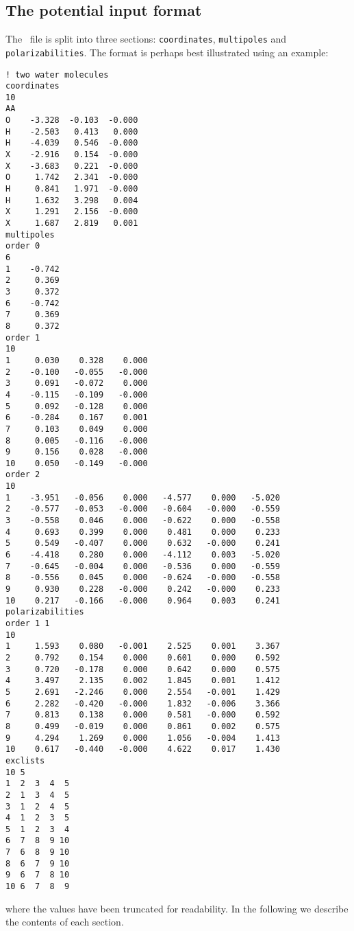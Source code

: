 \subsection*{The potential input format}
The \potinp\ file is split into three sections: \verb|coordinates|, 
\verb|multipoles| and \verb|polarizabilities|. The format is perhaps best 
illustrated using an example:
\begin{verbatim}
! two water molecules
coordinates
10
AA
O    -3.328  -0.103  -0.000
H    -2.503   0.413   0.000
H    -4.039   0.546  -0.000
X    -2.916   0.154  -0.000
X    -3.683   0.221  -0.000
O     1.742   2.341  -0.000
H     0.841   1.971  -0.000
H     1.632   3.298   0.004
X     1.291   2.156  -0.000
X     1.687   2.819   0.001
multipoles
order 0
6
1    -0.742
2     0.369
3     0.372
6    -0.742
7     0.369
8     0.372
order 1
10
1     0.030    0.328    0.000
2    -0.100   -0.055   -0.000
3     0.091   -0.072    0.000
4    -0.115   -0.109   -0.000
5     0.092   -0.128    0.000
6    -0.284    0.167    0.001
7     0.103    0.049    0.000
8     0.005   -0.116   -0.000
9     0.156    0.028   -0.000
10    0.050   -0.149   -0.000
order 2
10
1    -3.951   -0.056    0.000   -4.577    0.000   -5.020
2    -0.577   -0.053   -0.000   -0.604   -0.000   -0.559
3    -0.558    0.046    0.000   -0.622    0.000   -0.558
4     0.693    0.399    0.000    0.481    0.000    0.233
5     0.549   -0.407    0.000    0.632   -0.000    0.241
6    -4.418    0.280    0.000   -4.112    0.003   -5.020
7    -0.645   -0.004    0.000   -0.536    0.000   -0.559
8    -0.556    0.045    0.000   -0.624   -0.000   -0.558
9     0.930    0.228   -0.000    0.242   -0.000    0.233
10    0.217   -0.166   -0.000    0.964    0.003    0.241
polarizabilities
order 1 1
10
1     1.593    0.080   -0.001    2.525    0.001    3.367
2     0.792    0.154    0.000    0.601    0.000    0.592
3     0.720   -0.178    0.000    0.642    0.000    0.575
4     3.497    2.135    0.002    1.845    0.001    1.412
5     2.691   -2.246    0.000    2.554   -0.001    1.429
6     2.282   -0.420   -0.000    1.832   -0.006    3.366
7     0.813    0.138    0.000    0.581   -0.000    0.592
8     0.499   -0.019    0.000    0.861    0.002    0.575
9     4.294    1.269    0.000    1.056   -0.004    1.413
10    0.617   -0.440   -0.000    4.622    0.017    1.430
exclists
10 5
1  2  3  4  5
2  1  3  4  5
3  1  2  4  5
4  1  2  3  5
5  1  2  3  4
6  7  8  9 10
7  6  8  9 10
8  6  7  9 10
9  6  7  8 10
10 6  7  8  9
\end{verbatim}
where the values have been truncated for readability. In the following we describe the contents of each section.\\

